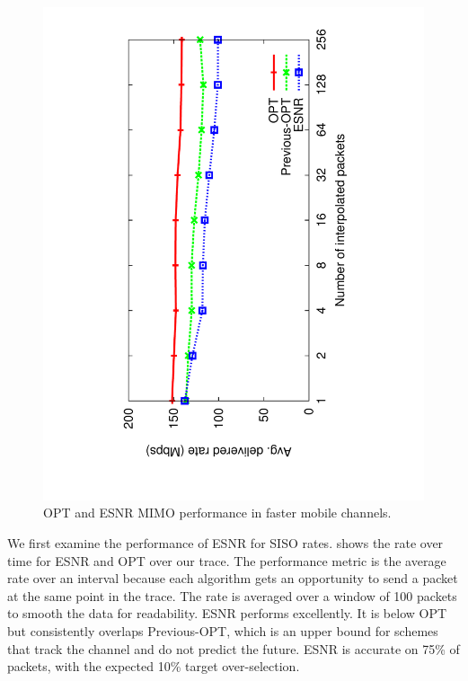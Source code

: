 \begin{figure}[p]
      \centering
      \includegraphics[angle=-90,viewport=125 68 491 760,clip,width=.95\columnwidth]{figures/mimo_rate_skip.pdf}
      \vspace{-2pt}
      \caption{\label{fig:mimo_eff_snr_speedup} OPT and ESNR MIMO performance in faster mobile channels.}
      \vspace{-2pt}
\end{figure}

 We first examine the performance of ESNR for SISO rates.  shows the rate over time for ESNR and OPT over our trace. The performance metric is the average rate over an interval because each algorithm gets an opportunity to send a packet at the same point in the trace. The rate is averaged over a window of 100 packets to smooth the data for readability. ESNR performs excellently. It is below OPT but consistently overlaps Previous-OPT, which is an upper bound for schemes that track the channel and do not predict the future. ESNR is accurate on 75\% of packets, with the expected 10\% target over-selection.

